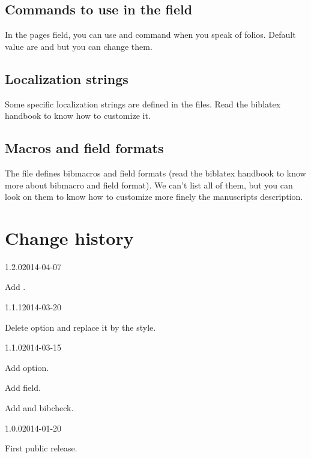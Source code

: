 \documentclass{ltxdockit}[2011/03/25]
\newcommand{\biblatex}{biblatex\xspace}
\begin{document}
\subsection{Commands to use in the  field}

In the pages field, you can use  and  command when you speak of folios. Default value are  and  but you can change them.

\subsection{Localization strings}

Some specific localization strings are defined in the  files. Read the \biblatex handbook to know how to customize it.

\subsection{Macros and field formats}

The  file defines bibmacros and field formats (read the \biblatex handbook to know more about bibmacro and field format). We can't list all of them, but you can look on them to know how to customize more finely the manuscripts description.

\section{Change history}

\begin{changelog}


\begin{release}{1.2.0}{2014-04-07}
	\item Add .
\end{release}

\begin{release}{1.1.1}{2014-03-20}
	\item Delete  option and replace it by the  style. 
\end{release}

\begin{release}{1.1.0}{2014-03-15}
\item Add  option.
\item Add  field.
\item Add  and  bibcheck. 
\end{release}

\begin{release}{1.0.0}{2014-01-20}
\item First public release.
\end{release}
\end{changelog}
\end{document}
